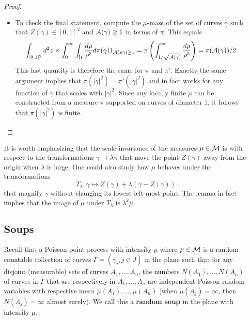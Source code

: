 \documentclass[11pt]{article}
\begin{document}
\begin {proof}
\begin {itemize}
 
 Clearly, the measure $\mu$ is also scale-invariant and translation-invariant. 
It follows that for any $f$ and $g$, 
 $$ \mu ( F( \gamma) f( |\gamma|) g ( Z (\gamma) )) = 
\tilde \mu ( F( \gamma) f( |\gamma|) g ( Z (\gamma) ))$$
and finally, using the product representation of $\mathcal U$, we get $\mu=\tilde \mu$.
 
\item
To check the final statement, compute
the $\mu$-mass of the set of curves $\gamma$ 
such that $Z ( \gamma) \in[0,1]^2$ and ${\cal A} ( \gamma) \ge 1$ 
in terms of $\pi$. This equals
$$ 
\int_{[0,1]^2} d^2 z \times \int_0^\infty \int_{\cal U} 
\frac {d \rho}{\rho^3} d\pi ( \gamma) 1_{{\cal A} (\rho \gamma) \ge 1 } 
= \pi \left( \int_{1 / \sqrt {{\cal A} (\gamma)} }^\infty 
\frac {d \rho}{\rho^3} \right) 
= \pi ( {\cal A} ( \gamma) )/ 2.
$$
This last quantity is therefore the same for $\pi$ and $\pi'$. 
Exactly the same argument implies that $\pi ( |\gamma|^2) = \pi' ( |\gamma|^2)$
and in fact works for any function of $\gamma$ that scales with $|\gamma|^2$.
Since any locally finite $\mu$ can be constructed from a measure $\pi$
supported on curves of diameter 1, it follows that $\pi ( |\gamma|^2 )$ is finite.
\end {itemize}
\end {proof}


\medbreak
It is worth emphasizing that the scale-invariance of the measures 
$\mu \in {\cal M}$ is with respect to the transformations 
$\gamma \mapsto \lambda \gamma$ that
move the point $Z(\gamma)$ away from the origin when $\lambda$ is large. 
One could also study how $\mu$ behaves under the transformations 
$$ T_\lambda : \gamma \mapsto Z(\gamma) + \lambda ( \gamma - Z (\gamma))$$
that magnify $\gamma$ without changing its lowest-left-most point. 
The lemma in fact implies that the image of $\mu$ 
under $T_\lambda$ is $\lambda^2 \mu$. 


\subsection {Soups}

Recall that a Poisson point process with intensity $\mu$
where $\mu \in \cal M$ is a random countable collection of curves
 $\Gamma = (\gamma_j, j \in J)$ 
in the plane such that for any 
disjoint (measurable) sets of curves $A_1, \dots, A_n$, 
the numbers $N(A_1), \ldots, N (A_n)$ of 
curves in $\Gamma$ that are respectively in $A_1, \ldots, A_n$ 
are independent Poisson random variables 
with respective mean $\mu (A_1), \ldots, \mu (A_n)$ (when $\mu (A_j)= \infty$, then $N(A_j)= \infty$ almost surely).
We call this a {\bf random soup} in the plane with intensity $\mu$.
\end{document}
